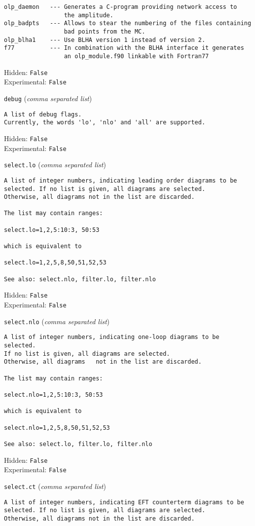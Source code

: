 \begin{basedescript}{\desclabelstyle{\pushlabel}}
\begin{verbatim}
olp_daemon   --- Generates a C-program providing network access to
                 the amplitude.
olp_badpts   --- Allows to stear the numbering of the files containing
                 bad points from the MC.
olp_blha1    --- Use BLHA version 1 instead of version 2.
f77          --- In combination with the BLHA interface it generates
                 an olp_module.f90 linkable with Fortran77
\end{verbatim}
Hidden: \verb|False|
\\Experimental: \verb|False|
\\\item[\colorbox{gray!30}{\texttt{debug}}] (\textit{comma separated list})
\begin{verbatim}
A list of debug flags.
Currently, the words 'lo', 'nlo' and 'all' are supported.
\end{verbatim}
Hidden: \verb|False|
\\Experimental: \verb|False|
\\\item[\colorbox{gray!30}{\texttt{select.lo}}] (\textit{comma separated list})
\begin{verbatim}
A list of integer numbers, indicating leading order diagrams to be
selected. If no list is given, all diagrams are selected.
Otherwise, all diagrams not in the list are discarded.

The list may contain ranges:

select.lo=1,2,5:10:3, 50:53

which is equivalent to

select.lo=1,2,5,8,50,51,52,53

See also: select.nlo, filter.lo, filter.nlo
\end{verbatim}
Hidden: \verb|False|
\\Experimental: \verb|False|
\\\item[\colorbox{gray!30}{\texttt{select.nlo}}] (\textit{comma separated list})
\begin{verbatim}
A list of integer numbers, indicating one-loop diagrams to be selected.
If no list is given, all diagrams are selected.
Otherwise, all diagrams   not in the list are discarded.

The list may contain ranges:

select.nlo=1,2,5:10:3, 50:53

which is equivalent to

select.nlo=1,2,5,8,50,51,52,53

See also: select.lo, filter.lo, filter.nlo
\end{verbatim}
Hidden: \verb|False|
\\Experimental: \verb|False|
\\\item[\colorbox{gray!30}{\texttt{select.ct}}] (\textit{comma separated list})
\begin{verbatim}
A list of integer numbers, indicating EFT counterterm diagrams to be
selected. If no list is given, all diagrams are selected.
Otherwise, all diagrams not in the list are discarded.


\end{verbatim}
\end{basedescript}
